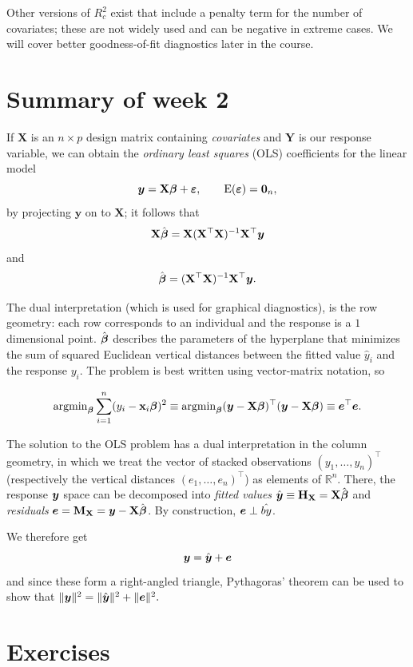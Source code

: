 \documentclass[]{book}
\theoremstyle{definition}
\theoremstyle{definition}
\theoremstyle{definition}
\theoremstyle{remark}
\begin{document}
Other versions of \(R^2_c\) exist that include a penalty term for the
number of covariates; these are not widely used and can be negative in
extreme cases. We will cover better goodness-of-fit diagnostics later in
the course.

\section{Summary of week 2}\label{summary-of-week-2}

If \(\mathbf{X}\) is an \(n \times p\) design matrix containing
\emph{covariates} and \(\boldsymbol{Y}\) is our response variable, we
can obtain the \emph{ordinary least squares} (OLS) coefficients for the
linear model
\[\boldsymbol{y} = \mathbf{X}\boldsymbol{\beta} + \boldsymbol{\varepsilon}, \qquad \mathrm{E}(\boldsymbol{\varepsilon})=\boldsymbol{0}_n,\]
by projecting \(\boldsymbol{y}\) on to \(\mathbf{X}\); it follows that
\[\mathbf{X}\hat{\boldsymbol{\beta}}=\mathbf{X}(\mathbf{X}^\top\mathbf{X})^{-1}\mathbf{X}^\top{\boldsymbol{y}}\]
and
\[\hat{\boldsymbol{\beta}} = (\mathbf{X}^\top\mathbf{X})^{-1}\mathbf{X}^\top{\boldsymbol{y}}.\]

The dual interpretation (which is used for graphical diagnostics), is
the row geometry: each row corresponds to an individual and the response
is a \(1\) dimensional point. \(\hat{\boldsymbol{\beta}}\) describes the parameters of the
hyperplane that minimizes the sum of squared Euclidean vertical
distances between the fitted value \(\hat{y}_i\) and the response
\(y_i\). The problem is best written using vector-matrix notation, so

\[ \mathrm{argmin}_{\boldsymbol{\beta}} \sum_{i=1}^n (y_i- \mathbf{x}_i\boldsymbol{\beta})^2 \equiv \mathrm{argmin}_{\boldsymbol{\beta}} (\boldsymbol{y} - \mathbf{X}\boldsymbol{\beta})^\top(\boldsymbol{y}-\mathbf{X}\boldsymbol{\beta}) \equiv \boldsymbol{e}^\top\boldsymbol{e}.
\]

The solution to the OLS problem has a dual interpretation in the column
geometry, in which we treat the vector of stacked observations
\((y_1, \ldots, y_n)^\top\) (respectively the vertical distances
\((e_1, \ldots, e_n)^\top\)) as elements of \(\mathbb{R}^n\). There, the
response \(\boldsymbol{y}\) space can be decomposed into \emph{fitted values}
\(\hat{{\boldsymbol{y}}} \equiv \mathbf{H}_{\mathbf{X}} = \mathbf{X}\hat{\boldsymbol{\beta}}\) and \emph{residuals}
\(\boldsymbol{e} = \mathbf{M}_{\mathbf{X}} = \boldsymbol{y} - \mathbf{X}\hat{\boldsymbol{\beta}}\). By construction,
\(\boldsymbol{e} \perp \hat{by}\).

We therefore get \[\boldsymbol{y} = \hat{\boldsymbol{y}} + \boldsymbol{e}\] and since these form
a right-angled triangle, Pythagoras' theorem can be used to show that
\(\|\boldsymbol{y}\|^2 = \|\hat{\boldsymbol{y}}\|^2 + \|\boldsymbol{e}\|^2.\)

\section{Exercises}\label{exercises-1}
\end{document}
